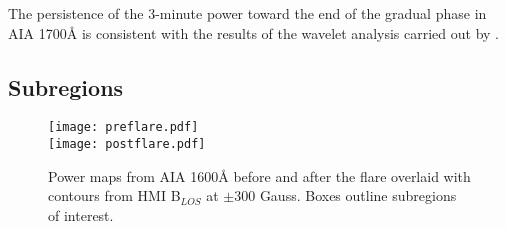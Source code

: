 The persistence of the 3-minute power toward the end of the gradual phase
in AIA 1700\AA{} is consistent with the results of the wavelet analysis
carried out by \cite{Milligan2017}.

\subsection{Subregions}

\begin{figure*}[htb!]\centering
    \texttt{[image: preflare.pdf]}\\
    \texttt{[image: postflare.pdf]}
    \caption{%
        Power maps from AIA 1600\AA{} before and after the flare
        overlaid with contours from HMI B$_{LOS}$ at $\pm$300 Gauss.
        Boxes outline subregions of interest.
        \label{subregions}}
\end{figure*}

